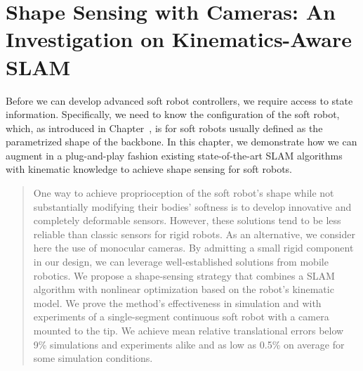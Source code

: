 \chapter{Shape Sensing with Cameras: An Investigation on Kinematics-Aware SLAM}
\label{chp:srslam}

\begin{foreword}
    Before we can develop advanced soft robot controllers, we require access to state information. Specifically, we need to know the configuration of the soft robot, which, as introduced in Chapter~\circled{\ref{chp:background}}, is for soft robots usually defined as the parametrized shape of the backbone.
    In this chapter, we demonstrate how we can augment in a plug-and-play fashion existing state-of-the-art \gls{SLAM} algorithms with kinematic knowledge to achieve shape sensing for soft robots.
\end{foreword}

\begin{abstract}
    One way to achieve proprioception of the soft robot's shape while not substantially modifying their bodies' softness is to develop innovative and completely deformable sensors. 
    However, these solutions tend to be less reliable than classic sensors for rigid robots. As an alternative, we consider here the use of monocular cameras. By admitting a small rigid component in our design, we can leverage well-established solutions from mobile robotics. We propose a shape-sensing strategy that combines a SLAM algorithm with nonlinear optimization based on the robot's kinematic model. We prove the method's effectiveness in simulation and with experiments of a single-segment continuous soft robot with a camera mounted to the tip. We achieve mean relative translational errors below 9\% simulations and experiments alike and as low as 0.5\% on average for some simulation conditions.
\end{abstract}



